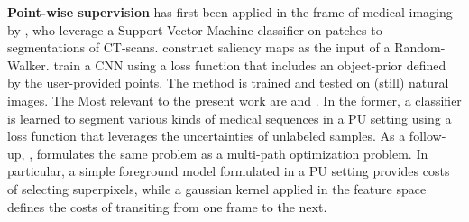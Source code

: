 \textbf{Point-wise supervision} has first been applied in the frame of medical imaging by \cite{vilarino07}, who leverage a Support-Vector Machine classifier on patches to segmentations of CT-scans.
\cite{khosravan16} construct saliency maps as the input of a Random-Walker.
\cite{bearman16} train a CNN using a loss function that includes an object-prior defined by the user-provided points. The method is trained and tested on (still) natural images.
The Most relevant to the present work are \cite{lejeune17} and \cite{lejeune18}.
In the former, a classifier is learned to segment various kinds of medical sequences in a PU setting using a loss function that leverages the uncertainties of unlabeled samples.
As a follow-up, \cite{lejeune18}, formulates the same problem as a multi-path optimization problem. In particular, a simple foreground model formulated in a PU setting provides costs of selecting superpixels, while a gaussian kernel applied in the feature space defines the costs of transiting from one frame to the next.



